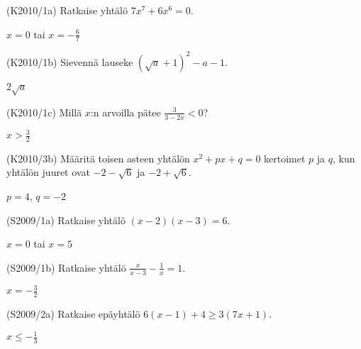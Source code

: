 \begin{tehtava}
(K2010/1a) Ratkaise yhtälö $7x^7+6x^6=0$.
\begin{vastaus}
$x=0$ tai $x=-\frac{6}{7}$
\end{vastaus}
\end{tehtava}

\begin{tehtava}
(K2010/1b) Sievennä lauseke $(\sqrt{a}+1)^2-a-1$.
\begin{vastaus}
$2\sqrt{a}$
\end{vastaus}
\end{tehtava}

\begin{tehtava}
(K2010/1c) Millä $x$:n arvoilla pätee $\frac{3}{3-2x}<0$?
\begin{vastaus}
$x>\frac{3}{2}$
\end{vastaus}
\end{tehtava}


\begin{tehtava}
(K2010/3b) Määritä toisen asteen yhtälön $x^2+px+q=0$ kertoimet $p$ ja $q$, kun yhtälön juuret ovat $-2-\sqrt{6}$ ja $-2+\sqrt{6}$.
\begin{vastaus}
$p=4$, $q=-2$
\end{vastaus}
\end{tehtava}

\begin{tehtava}
(S2009/1a) Ratkaise yhtälö $(x-2)(x-3)=6$. 
\begin{vastaus}
$x=0$ tai $x=5$
\end{vastaus}
\end{tehtava}

\begin{tehtava}
(S2009/1b) Ratkaise yhtälö $\frac{x}{x-3}-\frac{1}{x}=1$.
\begin{vastaus}
$x=-\frac{3}{2}$
\end{vastaus}
\end{tehtava}

\begin{tehtava}
(S2009/2a) Ratkaise epäyhtälö $6(x-1)+4 \geq 3(7x+1)$. 
\begin{vastaus}
$x \leq -\frac{1}{3}$
\end{vastaus}
\end{tehtava}


